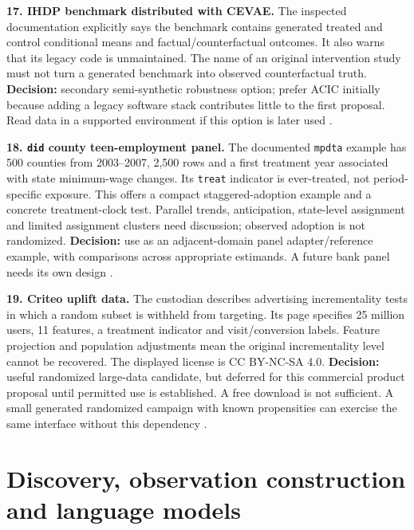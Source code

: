 \textbf{17. IHDP benchmark distributed with CEVAE.} The inspected
documentation explicitly says the benchmark contains generated treated
and control conditional means and factual/counterfactual outcomes. It
also warns that its legacy code is unmaintained. The name of an original
intervention study must not turn a generated benchmark into observed
counterfactual truth. \textbf{Decision:} secondary semi-synthetic
robustness option; prefer ACIC initially because adding a legacy
software stack contributes little to the first proposal. Read data in a
supported environment if this option is later used
\citep{pd15_cevae_pinned}.

\textbf{18. \texttt{did} county teen-employment panel.} The documented
\texttt{mpdta} example has 500 counties from 2003--2007, 2,500 rows and
a first treatment year associated with state minimum-wage changes. Its
\texttt{treat} indicator is ever-treated, not period-specific exposure.
This offers a compact staggered-adoption example and a concrete
treatment-clock test. Parallel trends, anticipation, state-level
assignment and limited assignment clusters need discussion; observed
adoption is not randomized. \textbf{Decision:} use as an adjacent-domain
panel adapter/reference example, with comparisons across appropriate
estimands. A future bank panel needs its own design \citep{pd15_mpdta}.

\textbf{19. Criteo uplift data.} The custodian describes advertising
incrementality tests in which a random subset is withheld from
targeting. Its page specifies 25 million users, 11 features, a treatment
indicator and visit/conversion labels. Feature projection and population
adjustments mean the original incrementality level cannot be recovered.
The displayed license is CC BY-NC-SA 4.0. \textbf{Decision:} useful
randomized large-data candidate, but deferred for this commercial
product proposal until permitted use is established. A free download is
not sufficient. A small generated randomized campaign with known
propensities can exercise the same interface without this dependency
\citep{pd15_criteo}.

\hypertarget{discovery-observation-construction-and-language-models}{%
\section{Discovery, observation construction and language
models}\label{discovery-observation-construction-and-language-models}}

